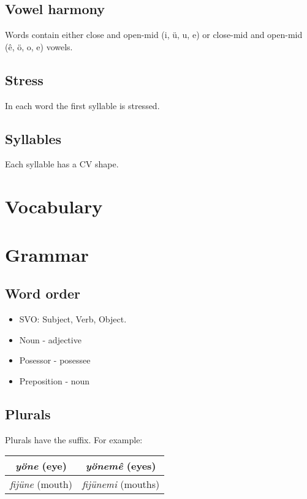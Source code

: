 \documentclass[a4paper]{article}
\begin{document}
\subsection{Vowel harmony}

Words contain either close and open-mid (i, \"u, u, e) or close-mid and
open-mid (\^e, \"o, o, e) vowels.

\subsection{Stress}

In each word the first syllable is stressed.

\subsection{Syllables}

Each syllable has a CV shape.

\section{Vocabulary}

\section{Grammar}

\subsection{Word order}

\begin{itemize}
\item SVO: Subject, Verb, Object.
\item Noun - adjective
\item Posessor - posessee
\item Preposition - noun
\end{itemize}

\subsection{Plurals}

Plurals have the  suffix. For example:
\begin{tabular}{c | c}
\emph{y\"one} (eye) & \emph{y\"onem\^e} (eyes) \\
\hline
\emph{fij\"une} (mouth) & \emph{fij\"unemi} (mouths)
\end{tabular}
\end{document}
